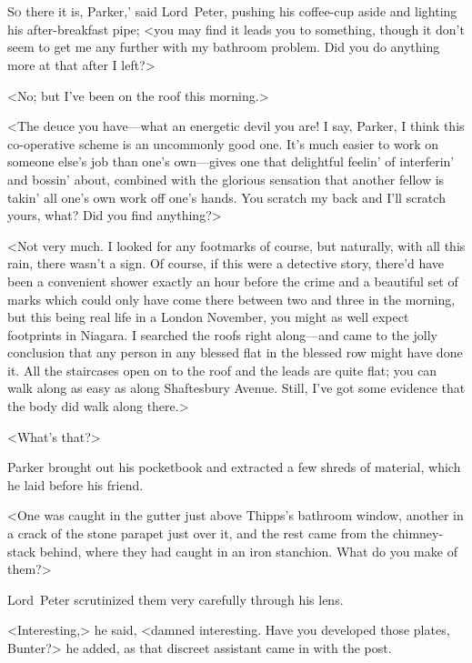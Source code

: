\chapter[Chapter \thechapter]{}
\lettrine[ante=‘—]{S}{o} there it is, Parker,' said Lord~Peter, pushing his coffee-cup aside and lighting his after-breakfast pipe; <you may find it leads you to something, though it don't seem to get me any further with my bathroom problem. Did you do anything more at that after I left?>

<No; but I've been on the roof this morning.>

<The deuce you have—what an energetic devil you are! I say, Parker, I think this co-operative scheme is an uncommonly good one. It's much easier to work on someone else's job than one's own—gives one that delightful feelin' of interferin' and bossin' about, combined with the glorious sensation that another fellow is takin' all one's own work off one's hands. You scratch my back and I'll scratch yours, what? Did you find anything?>

<Not very much. I looked for any footmarks of course, but naturally, with all this rain, there wasn't a sign. Of course, if this were a detective story, there'd have been a convenient shower exactly an hour before the crime and a beautiful set of marks which could only have come there between two and three in the morning, but this being real life in a London November, you might as well expect footprints in Niagara. I searched the roofs right along—and came to the jolly conclusion that any person in any blessed flat in the blessed row might have done it. All the staircases open on to the roof and the leads are quite flat; you can walk along as easy as along Shaftesbury Avenue. Still, I've got some evidence that the body did walk along there.>

<What's that?>

Parker brought out his pocketbook and extracted a few shreds of material, which he laid before his friend.

<One was caught in the gutter just above Thipps's bathroom window, another in a crack of the stone parapet just over it, and the rest came from the chimney-stack behind, where they had caught in an iron stanchion. What do you make of them?>

Lord~Peter scrutinized them very carefully through his lens.

<Interesting,> he said, <damned interesting. Have you developed those plates, Bunter?> he added, as that discreet assistant came in with the post.

